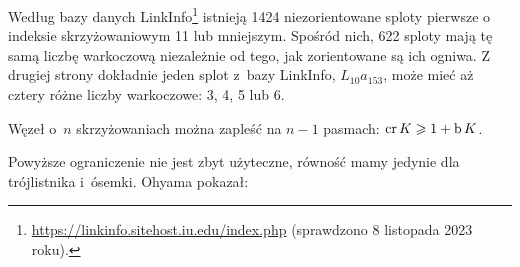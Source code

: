 Według bazy danych LinkInfo\footnote{\url{https://linkinfo.sitehost.iu.edu/index.php} (sprawdzono 8 listopada 2023 roku).} istnieją 1424 niezorientowane sploty pierwsze o indeksie skrzyżowaniowym 11 lub mniejszym.
Spośród nich, 622 sploty mają tę samą liczbę warkoczową niezależnie od tego, jak zorientowane są ich ogniwa.   
Z drugiej strony dokładnie jeden splot z~bazy LinkInfo, $L_{10}a_{153}$, może mieć aż cztery różne liczby warkoczowe: 3, 4, 5 lub 6.

\begin{proposition}
    Węzeł o~$n$ skrzyżowaniach można zapleść na $n - 1$ pasmach: $\operatorname{cr} K \geqslant 1 + \operatorname{b} K$.
\end{proposition}

Powyższe ograniczenie nie jest zbyt użyteczne, równość mamy jedynie dla trójlistnika i~ósemki.
Ohyama \cite{ohyama93} pokazał:
%

